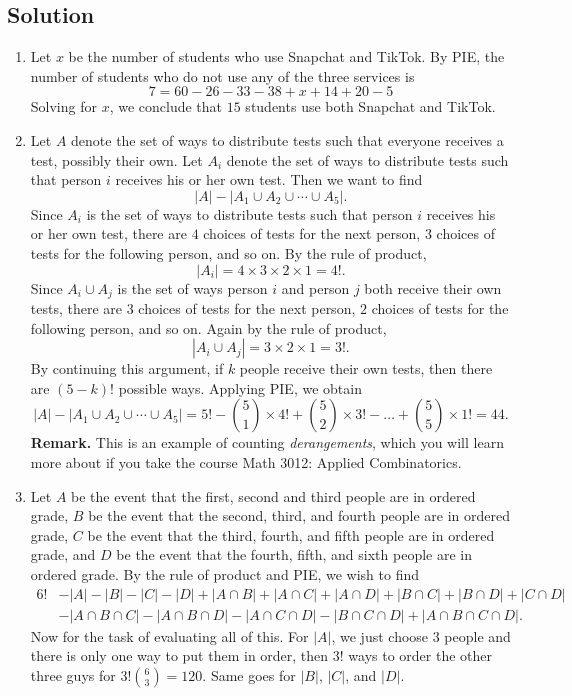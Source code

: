 \documentclass{article}
\begin{document}
\subsection*{Solution}
    \begin{enumerate}
        \item
        Let $x$ be the number of students who use Snapchat and TikTok. By PIE, the number of students who do not use any of the three services is
        $$7 = 60 - 26 - 33 - 38 + x + 14 + 20 - 5$$
        Solving for $x$, we conclude that $15$ students use both Snapchat and TikTok.
        \item Let $A$ denote the set of ways to distribute tests such that everyone receives a test, possibly their own. Let $A_{i}$ denote the set of ways to distribute tests such that person $i$ receives his or her own test. Then we want to find $$|A| - |A_{1} \cup A_{2} \cup \cdots \cup A_{5}|.$$ Since $A_{i}$ is the set of ways to distribute tests such that person $i$ receives his or her own test, there are $4$ choices of tests for the next person, $3$ choices of tests for the following person, and so on. By the rule of product, $$|A_{i}| = 4 \times 3 \times 2 \times 1 = 4!.$$ Since $A_{i} \cup A_{j}$ is the set of ways person $i$ and person $j$ both receive their own tests, there are $3$ choices of tests for the next person, $2$ choices of tests for the following person, and so on. Again by the rule of product, $$|A_{i} \cup A_{j}| = 3 \times 2 \times 1 = 3!.$$ By continuing this argument, if $k$ people receive their own tests, then there are $(5 - k)!$ possible ways. Applying PIE, we obtain $$|A| - |A_{1} \cup A_{2} \cup \cdots \cup A_{5}| = 5! - \binom{5}{1} \times 4! + \binom{5}{2} \times 3! - \dots + \binom{5}{5} \times 1! = 44.$$
        \textbf{Remark.} This is an example of counting \textit{derangements}, which you will learn more about if you take the course Math 3012: Applied Combinatorics.
        \item Let $A$ be the event that the first, second and third people are in ordered grade, $B$ be the event that the second, third, and fourth people are in ordered grade, $C$ be the event that the third, fourth, and fifth people are in ordered grade, and $D$ be the event that the fourth, fifth, and sixth people are in ordered grade. By the rule of product and PIE, we wish to find
        $$\begin{aligned}
        6! &- |A| - |B| - |C| - |D| + |A \cap B| + |A \cap C| + |A \cap D| + |B \cap C| + |B \cap D| + |C \cap D| \\
        &- |A \cap B \cap C| - |A \cap B \cap D| - |A \cap C \cap D| - |B \cap C \cap D| + |A \cap B \cap C \cap D|.
        \end{aligned}$$
        \qquad Now for the task of evaluating all of this. For $|A|$, we just choose $3$ people and there is only one way to put them in order, then $3!$ ways to order the other three guys for $3!\binom{6}{3} = 120$. Same goes for $|B|$, $|C|$, and $|D|$.
        

\end{enumerate}
\end{document}
